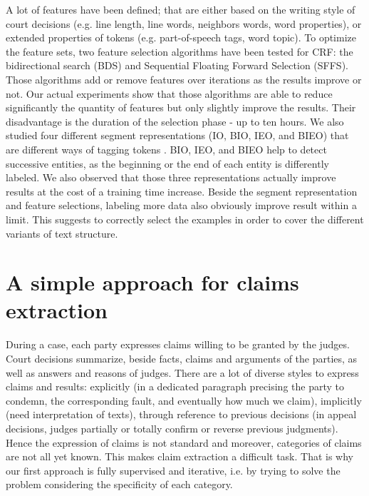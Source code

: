 \documentclass[runningheads,a4paper]{llncs}
\begin{document}
A lot of features have been defined; that are either based on the writing style of court decisions (e.g. line length, line words, neighbors words, word properties), or extended properties of tokens (e.g. part-of-speech tags, word topic). %
To optimize the feature sets, two feature selection algorithms have been tested for CRF: the bidirectional search (BDS) %
 and Sequential Floating Forward Selection (SFFS).%
Those algorithms add or remove features over iterations as the results improve or not. Our actual experiments show that those algorithms are able to reduce significantly the quantity of features but only slightly improve the results. Their disadvantage is the duration of the selection phase - up to ten hours.
We also studied four different segment representations (IO, BIO, IEO, and BIEO) that are different ways of tagging tokens \cite{konkol2015tagModel}. %
BIO, IEO, and BIEO  help to detect successive entities, as the beginning or the end of each entity is differently labeled. We also observed that those three representations actually improve results at the cost of a training time increase. Beside the segment representation and feature selections, labeling more data also obviously improve result within a limit. This suggests to correctly select the examples in order to cover the different variants of text structure. 

\section{A simple approach for claims extraction}

During a case, each party expresses claims willing to be granted by the judges. Court decisions summarize, beside facts, claims and arguments of the parties, as well as answers and reasons of judges. There are a lot of diverse styles to express claims and results: explicitly (in a dedicated paragraph precising the party to condemn, the corresponding fault, and eventually how much we claim), implicitly (need interpretation of texts), through reference to previous decisions (in appeal  decisions, judges partially or totally  confirm or reverse previous judgments). Hence the expression of claims is not standard and moreover, categories of claims are not all yet known. This makes claim extraction a difficult task. That is why our first approach is fully supervised and iterative, i.e. by trying to solve the problem considering the specificity of each category. 
\end{document}
